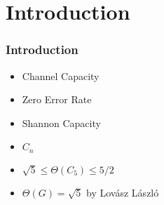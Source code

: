 \section{Introduction}

\begin{frame}
      \frametitle{Introduction}
      \begin{itemize}
            \item Channel Capacity
            \item Zero Error Rate
            \item Shannon Capacity
            \item $C_{n}$
            \item $\sqrt{5} \le \Theta(C_{5}) \le 5/2$
            \item $\Theta(G) = \sqrt{5}$ by Lovász László
      \end{itemize}
\end{frame}